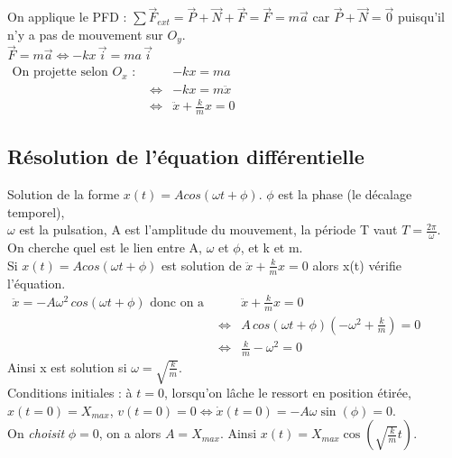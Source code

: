 \documentclass[a4paper,10pt]{book}
\begin{document}
On applique le PFD : $\sum \vec{F}_{ext}=\vec{P}+\vec{N}+\vec{F}=\vec{F}=m\vec{a}$ car $\vec{P}+\vec{N}=\vec{0}$ puisqu'il n'y a pas de mouvement sur $O_{y}$.\\

$\vec{F}=m\vec{a} \Leftrightarrow -kx\,\vec{i}=ma\,\vec{i}$\\

$\begin{array}{rcl} \text{On projette selon } O_{x} \text{ : } &&-kx=ma \\
&\Leftrightarrow &-kx=m \ddot{x} \\
&\Leftrightarrow &\ddot{x}+\frac{k}{m}x=0 \end{array}$

\subsection{Résolution de l'équation différentielle}
Solution de la forme $x(t)=Acos(\omega t+\phi)$. $\phi$ est la phase (le décalage temporel),\\$\omega$ est la pulsation, A est l'amplitude du mouvement, la période T vaut $T=\frac{2\pi}{\omega}$.\\

On cherche quel est le lien entre A, $\omega$ et $\phi$, et k et m.\\

Si $x(t)=Acos(\omega t+\phi)$ est solution de $\ddot{x}+\frac{k}{m}x=0$ alors x(t) vérifie l'équation.\\

$\begin{array}{rcl} \ddot{x}=-A\omega^{2}\,cos(\omega t+\phi)\text{ donc on a }&&\ddot{x}+\frac{k}{m}x=0 \\
&\Leftrightarrow &A\,cos(\omega t+\phi)(-\omega^{2}+\frac{k}{m})=0 \\
&\Leftrightarrow &\frac{k}{m}-\omega^{2}=0 \end{array}$\\

Ainsi x est solution si $\omega=\sqrt{\frac{k}{m}}$.\\

Conditions initiales : à $t=0$, lorsqu'on lâche le ressort en position étirée, $x(t=0)=X_{max}$, $v(t=0)=0 \Leftrightarrow \dot{x}(t=0)=-A\omega\sin(\phi)=0$.\\

On \textit{choisit} $\phi=0$, on a alors $A=X_{max}$. Ainsi $x(t)=X_{max}\cos(\sqrt{\frac{k}{m}}t)$.\\
\end{document}
